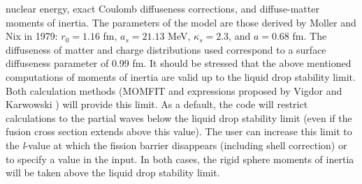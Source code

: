 \documentclass[twocolumn,amsmath,amssymb,10pt,groupedaddress,letter]{revtex4}
\begin{document}
nuclear energy, exact Coulomb diffuseness corrections, and diffuse-matter
moments of inertia. The parameters of the model are those derived
by Moller and Nix in 1979: $r_{0}=1.16$ fm, $a_{s}=21.13$ MeV, $\kappa_{s}=2.3$,
and $a=0.68$ fm. The diffuseness of matter and charge distributions
used correspond to a surface diffuseness parameter of 0.99 fm.
It should be stressed that the above mentioned computations of moments
of inertia are valid up to the liquid drop stability limit. Both calculation
methods (MOMFIT and expressions proposed by Vigdor and Karwowski \cite{VK})
will provide this limit. As a default, the code will restrict calculations
to the partial waves below the liquid drop stability limit (even if
the fusion cross section extends above this value). The user can increase
this limit to the \emph{l}-value at which the fission barrier disappears
(including shell correction) or to specify a value in the input. In
both cases, the rigid sphere moments of inertia will be taken above
the liquid drop stability limit.
\end{document}
